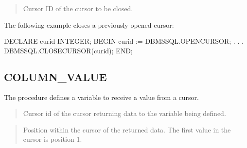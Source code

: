 \documentclass[letterpaper,10pt,english,openany,oneside]{sphinxmanual}
\begin{document}

\begin{quote}

Cursor ID of the cursor to be closed.
\end{quote}


The following example closes a previously opened cursor:

%
\begin{sphinxVerbatim}[commandchars=\\\{\}]
DECLARE
    curid           INTEGER;
BEGIN
    curid := DBMS\PYGZus{}SQL.OPEN\PYGZus{}CURSOR;
            .
            .
            .
    DBMS\PYGZus{}SQL.CLOSE\PYGZus{}CURSOR(curid);
END;
\end{sphinxVerbatim}

\newpage


\subsection{COLUMN\_VALUE}
\label{\detokenize{column_value::doc}}\label{\detokenize{column_value:column-value}}
The  procedure defines a variable to receive a value from a
cursor.

\begin{quote}


\end{quote}


\begin{quote}

Cursor id of the cursor returning data to the variable being defined.
\end{quote}

\begin{quote}

Position within the cursor of the returned data. The first value in the
cursor is position 1.
\end{quote}
\end{document}
